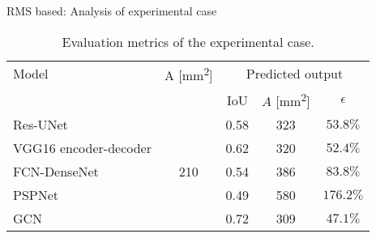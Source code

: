 \documentclass[10pt,aspectratio=169,dvipsnames]{beamer} %
\begin{document}
	\begin{frame}{RMS based: Analysis of experimental case}
		\begin{table}[!ht]
			\centering
			\caption{Evaluation metrics of the experimental case.}
			\label{tab:rms_exp_case_}
			\begin{tabular}{l@{\ }cccc}
				\toprule
				\multicolumn{1}{l}{Model} & \multicolumn{1}{c}{A [mm\textsuperscript{2}]} & \multicolumn{3}{c}{Predicted output} \\ 
				\cmidrule(lr){3-5} & & \multicolumn{1}{c}{IoU} & \multicolumn{1}{c}{\(\hat{A}\) [mm\textsuperscript{2}]} & \(\epsilon\) \\ \midrule
				Res-UNet & \multicolumn{1}{c}{\multirow{5}{*}{210}} & \multicolumn{1}{c}{0.58} & \multicolumn{1}{c}{323}  & \(53.8\%\) \\ 
				VGG16 encoder-decoder &  & \multicolumn{1}{c}{0.62} & \multicolumn{1}{c}{320} & \(52.4\%\) 
				\\ 
				FCN-DenseNet &  & \multicolumn{1}{c}{0.54} & \multicolumn{1}{c}{386} & \(83.8\%\) \\ 
				PSPNet &  & \multicolumn{1}{c}{0.49} & \multicolumn{1}{c}{580} & \(176.2\%\) 
				\\ 
				GCN &  & \multicolumn{1}{c}{0.72} & \multicolumn{1}{c}{309} & \(47.1\%\) 
				\\ 
				\bottomrule
			\end{tabular}		
		\end{table}
	\end{frame}
	\setcounter{subfigure}{0}
\end{document}
